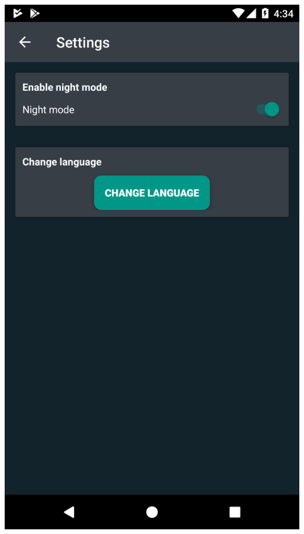 \documentclass[xetex,mathserif,serif]{beamer}
\begin{document}
\begin{frame}
\begin{columns}[t]
                    \includegraphics[scale=0.09]{images/settings.png}
                    
            \end{columns}
	\end{frame}	
	
\end{document}
